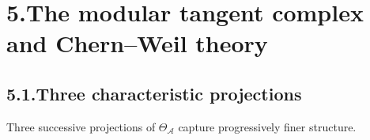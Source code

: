 \providecommand{\cA}{\mathcal{A}}
\providecommand{\barB}{\overline{B}}
\providecommand{\gAmod}{\mathfrak{g}_{\cA}^{\mathrm{mod}}}
\providecommand{\MC}{\text{MC}}
\providecommand{\cM}{\mathcal{M}}
\providecommand{\cC}{\mathcal{C}}
\providecommand{\cO}{\mathcal{O}}
\providecommand{\cP}{\mathcal{P}}
\providecommand{\Eone}{E_1}
\providecommand{\Convinf}{\mathrm{Conv}_\infty}
\providecommand{\Convstr}{\mathrm{Conv}_{\mathrm{str}}}
\providecommand{\fg}{\mathfrak{g}}
\providecommand{\Defcyc}{\mathrm{Def}_{\mathrm{cyc}}}

\section*{5.\quad The modular tangent complex and Chern--Weil theory}

\subsection*{5.1.\enspace Three characteristic projections}

Three successive projections of $\Theta_\cA$ capture progressively
finer structure.

\medskip

